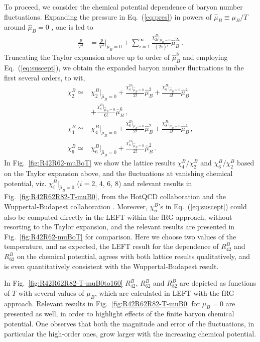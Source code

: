 \documentclass[%
reprint,
superscriptaddress,
showpacs,preprintnumbers,
 amsmath,amssymb,
 aps,
prd,
]{revtex4-1}
\def\Fig#1{Fig.~\ref{#1}} \def\Tab#1{Tab.~\ref{#1}}
\def\Eq#1{Eq.~(\ref{#1})}
\begin{document}
To proceed, we consider the chemical potential dependence of baryon number fluctuations. Expanding the pressure in \Eq{eq:pres} in powers of $\hat{\mu}_{B}\equiv\mu_B/T$ around $\hat{\mu}_{B}=0$ , one is led to 
%
\begin{align}
  \frac{p}{T^4}&=\frac{p}{T^4}\Big|_{\hat{\mu}_{B}=0}+\sum_{i=1}^{\infty}\frac{\chi^B_{2i}|_{\hat{\mu}_{B}=0}}{(2i)!}\hat{\mu}_{B}^{2i}\,.\label{eq:cmu}
\end{align}
%
Truncating the Taylor expansion above up to order of $\hat{\mu}_{B}^{8}$ and employing \Eq{eq:suscept}, we obtain the expanded baryon number fluctuations in the first several orders, to wit,
%
\begin{align}
\chi^B_2\simeq&\chi^B_2|_{\hat{\mu}_{B}=0}+\frac{\chi^B_4|_{\hat{\mu}_{B}=0}}{2!}\hat{\mu}_{B}^{2}+\frac{\chi^B_6|_{\hat{\mu}_{B}=0}}{4!}\hat{\mu}_{B}^{4}\nonumber\\[2ex]
&+\frac{\chi^B_8|_{\hat{\mu}_{B}=0}}{6!}\hat{\mu}_{B}^{6}\,,\label{}\\[2ex]
\chi^B_4\simeq&\chi^B_4|_{\hat{\mu}_{B}=0}+\frac{\chi^B_6|_{\hat{\mu}_{B}=0}}{2!}\hat{\mu}_{B}^{2}+\frac{\chi^B_8|_{\hat{\mu}_{B}=0}}{4!}\hat{\mu}_{B}^{4}\,,\\[2ex]
\chi^B_6\simeq&\chi^B_6|_{\hat{\mu}_{B}=0}+\frac{\chi^B_8|_{\hat{\mu}_{B}=0}}{2!}\hat{\mu}_{B}^{2}\,.\label{}
\end{align}
%
In \Fig{fig:R42R62-muBoT} we show the lattice results $\chi^B_4/\chi^B_2$ and $\chi^B_6/\chi^B_2$ based on the Taylor expansion above, and the fluctuations at vanishing chemical potential, viz. $\chi^B_{i}|_{\hat{\mu}_{B}=0}$ ($i=2$, 4, 6, 8) and relevant results in \Fig{fig:R42R62R82-T-muB0}, from the HotQCD collaboration \cite{Bazavov:2020bjn} and the Wuppertal-Budapest collaboration \cite{Borsanyi:2018grb}. Moreover, $\chi^B_n$'s in \Eq{eq:suscept} could also be computed directly in the LEFT within the fRG approach, without resorting to the Taylor expansion, and the relevant results are presented in \Fig{fig:R42R62-muBoT} for comparison. Here we choose two values of the temperature, and as expected, the LEFT result for the dependence of $R^{B}_{42}$ and $R^{B}_{62}$ on the chemical potential, agrees with both lattice results qualitatively, and is even quantitatively consistent with the Wuppertal-Budapest result.

In \Fig{fig:R42R62R82-T-muB0to160} $R^{B}_{42}$, $R^{B}_{62}$ and $R^{B}_{82}$ are depicted as functions of $T$ with several values of $\mu_B$, which are calculated in LEFT with the fRG approach. Relevant results in \Fig{fig:R42R62R82-T-muB0} for $\mu_B=0$ are presented as well, in order to highlight effects of the finite baryon chemical potential. One observes that both the magnitude and error of the fluctuations, in particular the high-order ones, grow larger with the increasing chemical potential.
\end{document}
